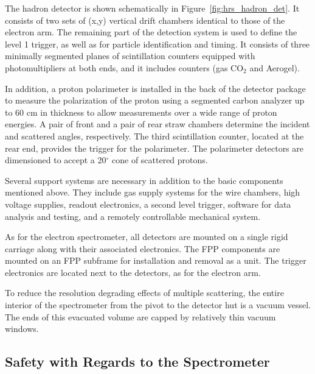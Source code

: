 {The hadron detector is shown schematically in 
Figure~\ref{fig:hrs_hadron_det}.  It consists 
of two sets of (x,y) vertical drift chambers identical to those of the 
electron arm.  The remaining part of the detection system is used to 
define the level 1 trigger, as well as for particle identification and 
timing.  It consists of three minimally segmented planes of 
scintillation counters equipped with photomultipliers at both ends, and 
it includes \Cherenkov{} counters (gas CO$_2$ and Aerogel).

In addition, a proton polarimeter is installed in the back of the 
detector package to measure the polarization of the proton using a 
segmented carbon analyzer up to 60 cm in thickness to allow measurements 
over a wide range of proton energies.  A pair of front and a pair of 
rear straw chambers determine the incident and 
scattered angles, respectively.  The third scintillation counter, 
located at the rear end, provides the trigger for the polarimeter.  The 
polarimeter detectors are dimensioned to accept a 20$^{\circ}$ cone of 
scattered protons.

Several support systems are necessary in addition to the basic 
components mentioned above.  They include gas supply systems for the 
wire chambers, high voltage supplies, readout electronics, a second 
level trigger, software for data analysis and testing, and a remotely 
controllable mechanical system.

As for the electron spectrometer, all detectors are mounted on a 
single rigid carriage along with their associated electronics.  The FPP 
components are mounted on an FPP subframe for installation and removal as 
a unit.  The trigger electronics are located next to the detectors, 
as for the electron arm.

} %

To reduce the resolution degrading effects of multiple scattering, the 
entire interior of the spectrometer from the pivot to the detector hut 
is a vacuum vessel.  The ends of this evacuated volume are capped by 
relatively thin vacuum windows.


\begin{safetyen}{10}{15}
\section{Safety with Regards to the Spectrometer}
\end{safetyen}

